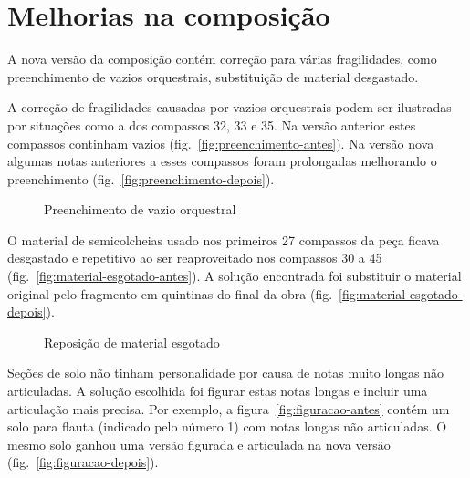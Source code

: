 \documentclass[10pt]{article}
\begin{document}
\section{Melhorias na composição}
\label{sec:melh-na-comp}

A nova versão da composição contém correção para várias fragilidades,
como preenchimento de vazios orquestrais, substituição de material
desgastado.

A correção de fragilidades causadas por vazios orquestrais podem ser
ilustradas por situações como a dos compassos 32, 33 e 35. Na versão
anterior estes compassos continham vazios
(fig.~\ref{fig:preenchimento-antes}). Na versão nova algumas notas
anteriores a esses compassos foram prolongadas melhorando o
preenchimento (fig.~\ref{fig:preenchimento-depois}).

\begin{figure*}
  \centering

  \caption{Preenchimento de vazio orquestral}
  \label{fig:preenchimento-vazio-orquestral}
\end{figure*}

O material de semicolcheias usado nos primeiros 27 compassos da peça
ficava desgastado e repetitivo ao ser reaproveitado nos compassos 30 a
45 (fig.~\ref{fig:material-esgotado-antes}). A solução encontrada foi
substituir o material original pelo fragmento em quintinas do final da
obra (fig.~\ref{fig:material-esgotado-depois}).

\begin{figure*}
  \centering

  \caption{Reposição de material esgotado}
  \label{fig:reposicao-material-esgotado}
\end{figure*}

Seções de solo não tinham personalidade por causa de notas muito
longas não articuladas. A solução escolhida foi figurar estas notas
longas e incluir uma articulação mais precisa. Por exemplo, a
figura~\ref{fig:figuracao-antes} contém um solo para flauta (indicado
pelo número 1) com notas longas não articuladas. O mesmo solo ganhou
uma versão figurada e articulada na nova versão
(fig.~\ref{fig:figuracao-depois}).
\end{document}
